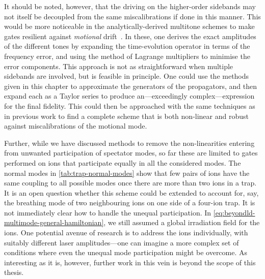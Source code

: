 It should be noted, however, that the driving on the higher-order sidebands may not itself be decoupled from the same miscalibrations if done in this manner.
This would be more noticeable in the analytically-derived multitone schemes to make gates resilient against \emph{motional} drift~\cite{Webb2018,Shapira2018}.
In these, one derives the exact amplitudes of the different tones by expanding the time-evolution operator in terms of the frequency error, and using the method of Lagrange multipliers to minimise the error components.
This approach is not as straightforward when multiple sidebands are involved, but is feasible in principle.
One could use the methods given in this chapter to approximate the generators of the propagators, and then expand each as a Taylor series to produce an---exceedingly complex---expression for the final fidelity.
This could then be approached with the same techniques as in previous work to find a complete scheme that is both non-linear and robust against miscalibrations of the motional mode.

Further, while we have discussed methods to remove the non-linearities entering from unwanted participation of spectator modes, so far these are limited to gates performed on ions that participate equally in all the considered modes.
The normal modes in \cref{tab:trap-normal-modes} show that few pairs of ions have the same coupling to all possible modes once there are more than two ions in a trap.
It is an open question whether this scheme could be extended to account for, say, the breathing mode of two neighbouring ions on one side of a four-ion trap.
It is not immediately clear how to handle the unequal participation.
In \cref{eq:beyondld-multimode-general-hamiltonian}, we still assumed a global irradiation field for the ions.
One potential avenue of research is to address the ions individually, with suitably different laser amplitudes---one can imagine a more complex set of conditions where even the unequal mode participation might be overcome.
As interesting as it is, however, further work in this vein is beyond the scope of this thesis.
